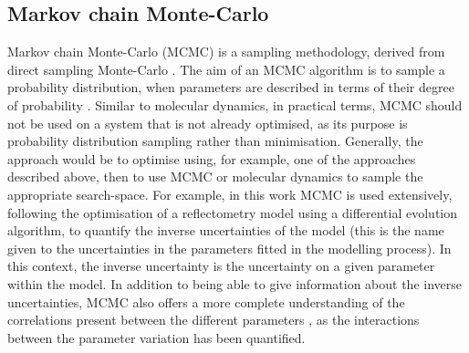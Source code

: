 \subsection{Markov chain Monte-Carlo}
\label{sec:mcmc}
Markov chain Monte-Carlo (MCMC) is a sampling methodology, derived from direct sampling Monte-Carlo \cite{krauth_statistical_2006}.
The aim of an MCMC algorithm is to sample a probability distribution, when parameters are described in terms of their degree of probability \cite{sivia_data_2006}.
Similar to molecular dynamics, in practical terms, MCMC should not be used on a system that is not already optimised, as its purpose is probability distribution sampling rather than minimisation.
Generally, the approach would be to optimise using, for example, one of the approaches described above, then to use MCMC or molecular dynamics to sample the appropriate search-space.
For example, in this work MCMC is used extensively, following the optimisation of a reflectometry model using a differential evolution algorithm, to quantify the inverse uncertainties of the model (this is the name given to the uncertainties in the parameters fitted in the modelling process).
In this context, the inverse uncertainty is the uncertainty on a given parameter within the model.
In addition to being able to give information about the inverse uncertainties, MCMC also offers a more complete understanding of the correlations present between the different parameters \cite{gilks_markov_1995}, as the interactions between the parameter variation has been quantified.

